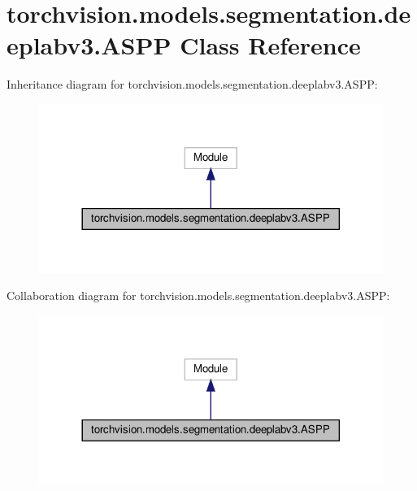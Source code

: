 \hypertarget{classtorchvision_1_1models_1_1segmentation_1_1deeplabv3_1_1ASPP}{}\section{torchvision.\+models.\+segmentation.\+deeplabv3.\+A\+S\+PP Class Reference}
\label{classtorchvision_1_1models_1_1segmentation_1_1deeplabv3_1_1ASPP}


Inheritance diagram for torchvision.\+models.\+segmentation.\+deeplabv3.\+A\+S\+PP\+:
\nopagebreak
\begin{figure}[H]
\begin{center}
\leavevmode
\includegraphics[width=317pt]{classtorchvision_1_1models_1_1segmentation_1_1deeplabv3_1_1ASPP__inherit__graph}
\end{center}
\end{figure}


Collaboration diagram for torchvision.\+models.\+segmentation.\+deeplabv3.\+A\+S\+PP\+:
\nopagebreak
\begin{figure}[H]
\begin{center}
\leavevmode
\includegraphics[width=317pt]{classtorchvision_1_1models_1_1segmentation_1_1deeplabv3_1_1ASPP__coll__graph}
\end{center}
\end{figure}
